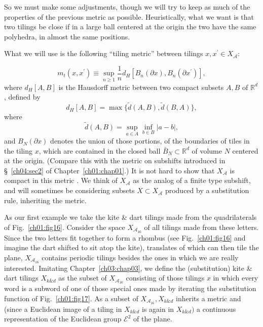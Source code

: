 \documentclass[reqno]{stml-l}
\theoremstyle{plain}
\theoremstyle{definition}
\numberwithin{equation}{chapter}
\begin{document}
So we must make some adjustments, though we will try to keep as much of the properties of the previous metric as possible. Heuristically, what we want is that two tilings be close if in a large ball centered at the origin the two have the same polyhedra, in almost the same positions.

What we will use is the following ``tiling metric'' between tilings $x,x^{\prime}\in X_{\mathcal{A}}$:

\begin{equation}\label{ch04:eqn4.1}
m_{t}(x, x^{\prime})\equiv\sup_{n\geq 1}\frac{1}{n}d_{H}[B_{n}(\partial x), B_{n}(\partial x^{\prime})],
\end{equation}
where $d_{H}[A, B]$ is the Hausdorff metric between two compact subsets $A,B$ of $\mathbb{R}^{d}$, defined by
\begin{equation}\label{ch04:eqn4.2}
d_{H}[A, B]=\max\{\tilde{d}(A, B),\tilde{d}(B, A)\},
\end{equation}
where
\begin{equation}\label{ch04:eqn4.3}
\tilde{d}(A, B)=\sup_{a\in A}\inf_{b\in B}|a-b|,
\end{equation}
and $B_{N}(\partial x)$ denotes the union of those portions, of the boundaries of tiles in the tiling $x$, which are contained in the closed ball $\bar{B}_{N}\subset \mathbb{R}^{d}$ of volume $N$ centered at the origin. (Compare this with the metric on subshifts introduced in \S~\ref{ch04:sec2} of Chapter~\ref{ch01:chap01}.) It is not hard to show that $X_{\mathcal{A}}$ is compact in this metric \cite{bib:RaW}. We think of $X_{\mathcal{A}}$ as the analog of a finite type subshift, and will sometimes be considering subsets $X\subset X_{\mathcal{A}}$ produced by a substitution rule, inheriting the metric.

As our first example we take the kite \& dart tilings made
from the quadrilaterals of Fig.~\ref{ch01:fig16}. Consider
the space $X_{\mathcal{A}_{16}}$ of all tilings made from
these letters. Since the two letters fit together to form a
rhombus (see Fig.~\ref{ch01:fig16} and imagine the dart
shifted to sit atop the kite), translates of which can then
tile the plane, $X_{\mathcal{A}_{16}}$ contains periodic
tilings besides the ones in which we are really interested.
Imitating Chapter~\ref{ch03:chap03}, we define the
(substitution) kite \& dart tilings $X_{k\& d}$ as the
subset of $X_{\mathcal{A}_{16}}$ consisting of those
tilings $x$ in which every word is a subword of one of
those special ones made by iterating the substitution
function of Fig.~\ref{ch01:fig17}. As a subset of
$X_{\mathcal{A}_{16}},X_{k\& d}$ inherits a metric and
(since a Euclidean image of a tiling in $X_{k\& d}$ is
again in $X_{k\& d})$ a continuous representation of the
Euclidean group $\mathcal{E}^{2}$ of the plane.
\end{document}
